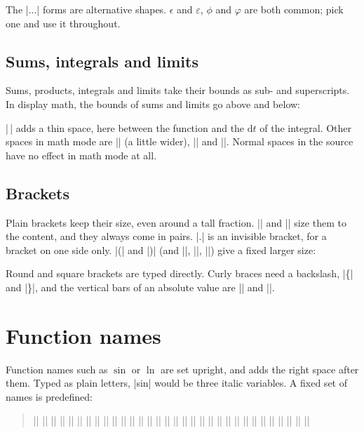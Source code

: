 The \code|\var...| forms are alternative shapes.
$\epsilon$ and $\varepsilon$, $\phi$ and $\varphi$ are both common;
pick one and use it throughout.

\subsection{Sums, integrals and limits}

Sums, products, integrals and limits take their bounds as sub- and superscripts.
In display math, the bounds of sums and limits go above and below:


\code|\,| adds a thin space, here between the function and the $\mathrm{d}t$ of the integral.
Other spaces in math mode are \code|\;| (a little wider), \code|\quad| and \code|\qquad|.
Normal spaces in the source have no effect in math mode at all.

\subsection{Brackets}

Plain brackets keep their size, even around a tall fraction.
\code|\left| and \code|\right| size them to the content, and they always come in pairs.
\code|\left.| is an invisible bracket, for a bracket on one side only.
\code|\bigl(| and \code|\bigr)| (and \code|\Bigl|, \code|\biggl|, \code|\Biggl|) give a fixed larger size:


Round and square brackets are typed directly.
Curly braces need a backslash, \code|\{| and \code|\}|,
and the vertical bars of an absolute value are \code|\lvert| and \code|\rvert|.

\section{Function names}\label{sec:operators}

Function names such as $\sin$ or $\ln$ are set upright,
and  adds the right space after them.
Typed as plain letters, \code|sin| would be three italic variables.
A fixed set of names is predefined:

\begin{quote}
    \code|\sin| \code|\cos| \code|\tan| \code|\cot| \code|\sec| \code|\csc|
    \code|\arcsin| \code|\arccos| \code|\arctan|
    \code|\sinh| \code|\cosh| \code|\tanh| \code|\coth|
    \code|\exp| \code|\ln| \code|\log| \code|\lg|
    \code|\lim| \code|\liminf| \code|\limsup| \code|\max| \code|\min| \code|\sup| \code|\inf|
    \code|\det| \code|\dim| \code|\ker| \code|\deg| \code|\arg| \code|\gcd| \code|\Pr| \code|\hom|
\end{quote}

